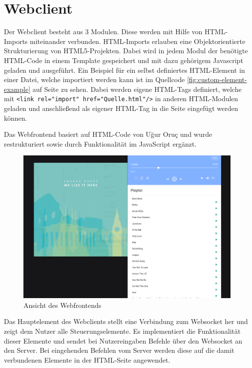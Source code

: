 \documentclass[12pt,a4paper,hidelinks]{scrreprt}
\begin{document}
\newpage
\section{Webclient}\label{sec:webclient}
	Der Webclient besteht aus 3 Modulen. Diese werden mit Hilfe von HTML-Imports miteinander verbunden. HTML-Imports erlauben eine Objektorientierte Strukturierung von HTML5-Projekten. Dabei wird in jedem Modul der benötigte HTML-Code in einem Template gespeichert und mit dazu gehörigem Javascript geladen und ausgeführt. \cite{w3c-customEm-0216}
	Ein Beispiel für ein selbst definiertes HTML-Element in einer Datei, welche importiert werden kann ist im Quellcode \ref{fig:custom-element-example} auf Seite \pageref{fig:custom-element-example} zu sehen.
	Dabei werden eigene HTML-Tags definiert, welche mit \texttt{<link rel="import" href="Quelle.html"/>} in anderen HTML-Modulen geladen und anschließend als eigener HTML-Tag in die Seite eingefügt werden können.
	
	Das Webfrontend basiert auf HTML-Code von Uğur Oruç und wurde restrukturiert sowie durch Funktionalität im JavaScript ergänzt. \cite{materializemusic}
	
	\begin{figure}
	\centering
	\includegraphics[width=0.8\linewidth]{./img/Screenshot_20170717_211638.png}
	\caption{Ansicht des Webfrontends}
	\label{fig:screenshot20170717211638}
	\end{figure}
	
	Das Hauptelement des Webclients stellt eine Verbindung zum Websocket her und zeigt dem Nutzer alle Steuerungselemente. 
	Es implementiert die Funktionalität dieser Elemente und sendet bei Nutzereingaben Befehle über den Websocket an den Server. Bei eingehenden Befehlen vom Server werden diese auf die damit verbundenen Elemente in der HTML-Seite angewendet.
	
\end{document}
